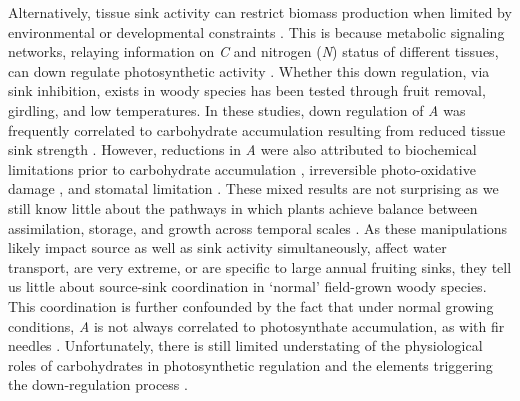 \documentclass[a4paper]{article}\usepackage[]{graphicx}\usepackage[]{color}
\begin{document}
Alternatively, tissue sink activity can restrict biomass production when limited by environmental or developmental constraints \citep{korner2003carbon}. This is because metabolic signaling networks, relaying information on \textit{C} and nitrogen (\textit{N}) status of different tissues, can down regulate photosynthetic activity \citep{paul2001sink}.  Whether this down regulation, via sink inhibition, exists in woody species has been tested through fruit removal, girdling, and low temperatures. In these studies, down regulation of \textit{A} was frequently correlated to carbohydrate accumulation resulting from reduced tissue sink strength \citep{iglesias2002regulation,hoch2002altitudinal,urban2007girdling, haouari2013fruit}. However, reductions in \textit{A} were also attributed to biochemical limitations prior to carbohydrate accumulation \citep{nebauer2011photosynthesis}, irreversible photo-oxidative damage \citep{duan2008photosynthetic}, and stomatal limitation \citep{li2005photosynthesis}. These mixed results are not surprising as we still know little about the pathways in which plants achieve balance between assimilation, storage, and growth across temporal scales \citep{smith2007coordination}. As these manipulations likely impact source as well as sink activity simultaneously, affect water transport, are very extreme, or are specific to large annual fruiting sinks, they tell us little about source-sink coordination in ‘normal’ field-grown woody species. This coordination is further confounded by the fact that under normal growing conditions, \textit{A} is not always correlated to photosynthate accumulation, as with fir needles \citep{little1973effect}. Unfortunately, there is still limited understating of the physiological roles of carbohydrates in photosynthetic regulation and the elements triggering the down-regulation process \citep{nebauer2011photosynthesis}. 
\end{document}

